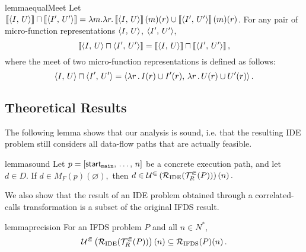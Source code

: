 \begin{restatable}{lemma}{equalMeet}\label{lem:equalMeet}
\label{lem:equalMeet}
    Let $\left\llbracket\left\langle I,\,U\right\rangle\right\rrbracket \sqcap \left\llbracket\left\langle I',\,U'\right\rangle\right\rrbracket
     =\lambda m.\lambda r.\left\llbracket\left\langle I,\,U\right\rangle\right\rrbracket(m)(r)\cup\left\llbracket\left\langle I',\,U'\right\rangle\right\rrbracket(m)(r)$.
    For any pair of micro-function representations $\left\langle I,\,U\right\rangle$, $\left\langle I',\,U'\right\rangle$,
    \begin{equation}
        \left\llbracket\left\langle I,\,U\right\rangle \sqcap \left\langle I',\,U'\right\rangle\right\rrbracket
        = 
        \left\llbracket\left\langle I,\,U\right\rangle\right\rrbracket \sqcap \left\llbracket\left\langle I',\,U'\right\rangle\right\rrbracket,
    \end{equation}
    where the meet of two micro-function representations is defined as follows:
$$\left\langle I,\,U\right\rangle \sqcap \left\langle I',\,U'\right\rangle = \left\langle \lambda r\,.\,I(r) \cup I'(r),\,\lambda r\,.\,U(r) \cup U'(r)\right\rangle.$$
\end{restatable}

\subsection{Theoretical Results}

The following lemma shows that our analysis is sound, i.e. 
that the resulting IDE problem still considers all data-flow
paths that are actually feasible.

\begin{restatable}[Soundness]{lemma}{sound}\label{lem:sound}
  Let $p=[\textsf{start}_\texttt{main},\,\dots,\,n]$ be a concrete execution path, and let $d\in D$.
  If $d\in M_F(p)(\varnothing),$
  then
  $
    d\in \mathcal U^\Subset\left(\mathcal R_{\text{IDE}}(\mathcal T^\Subset_R(P))\right)(n)\,.
  $
\end{restatable}

We also show that the result of an IDE problem obtained through a correlated-calls transformation is a subset of the original IFDS result.

\begin{restatable}[Precision]{lemma}{precision}\label{lem:subsetifds}
    For an IFDS problem $P$ and all ${n\in N^*}$,
    \begin{equation}
      \mathcal U^\Subset\left(\mathcal R_{\text{IDE}}(\mathcal T^\Subset_R(P))\right)(n)
      \subseteq
      \mathcal R_{\text{IFDS}}(P)(n)\,.
    \end{equation}
\end{restatable}

